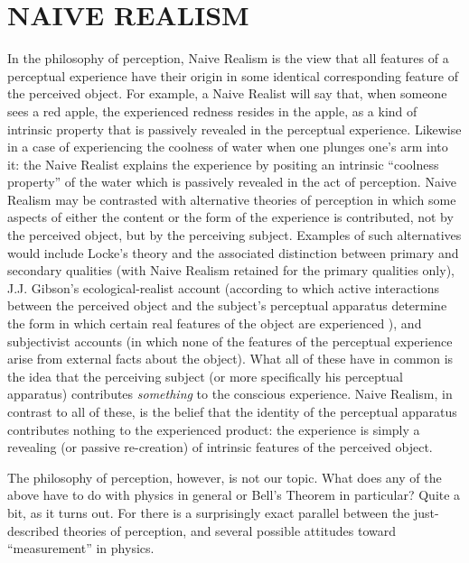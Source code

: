 \documentclass[12pt]{article}
\begin{document}
\section{NAIVE REALISM}
\label{secNR}

In the philosophy of perception, Naive Realism is the view that all
features of a perceptual experience have their origin in some identical
corresponding feature of the perceived object.  For example, a Naive
Realist will say that, when someone sees a red apple, the experienced
redness resides in the apple, as a kind of intrinsic property that is
passively revealed in the perceptual experience.  Likewise in a case 
of experiencing the coolness of water when one plunges one's arm into
it: the Naive Realist explains the experience by positing an intrinsic
``coolness property'' of the water which is passively revealed in the
act of perception.  Naive Realism may be contrasted with
alternative theories of perception in which some aspects of
either the content or the
form of the experience is contributed, not by the perceived object,
but by the perceiving subject.  Examples of such alternatives
would include Locke's theory and the associated distinction between
primary and secondary qualities (with Naive Realism retained for the
primary qualities only), J.J. Gibson's ecological-realist 
account (according to which active interactions between the perceived
object and the subject's perceptual apparatus determine the 
form in which certain real features of the object are experienced
\cite{gibson}), 
and subjectivist accounts (in which none of the features of
the perceptual experience arise from external facts about the
object).  What all of these have in common 
is the idea that the perceiving subject (or more 
specifically his perceptual apparatus) contributes \emph{something} to
the conscious experience.  Naive Realism, in contrast to all of these,
is the belief that the identity of the perceptual apparatus
contributes nothing to the experienced product:  the experience is
simply a revealing (or passive re-creation)
of intrinsic features of the perceived object.

The philosophy of perception, however, is not our topic.  What does
any of the above have to do with physics in general or Bell's Theorem
in particular?  Quite a bit, as it turns out.  For there is a
surprisingly exact parallel between the just-described theories of
perception, and several possible attitudes toward ``measurement'' in
physics.  
\end{document}
